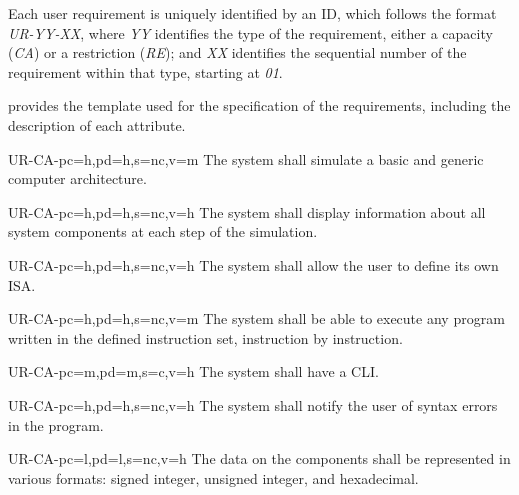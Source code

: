Each user requirement is uniquely identified by an ID, which follows the format \textit{UR-YY-XX}, where \textit{YY} identifies the type of the requirement, either a capacity (\textit{CA}) or a restriction (\textit{RE}); and \textit{XX} identifies the sequential number of the requirement within that type, starting at \textit{01}.

 provides the template used for the specification of the requirements, including the description of each attribute.




\setcounter{i}{1}

\begin{userReq}{UR-CA-}{pc=h,pd=h,s=nc,v=m}
  The system shall simulate a basic and generic computer architecture.
\end{userReq}

\begin{userReq}{UR-CA-}{pc=h,pd=h,s=nc,v=h}
  The system shall display information about all system components at each step of the simulation.
\end{userReq}

\begin{userReq}{UR-CA-}{pc=h,pd=h,s=nc,v=h}
  The system shall allow the user to define its own \gls{ISA}.
\end{userReq}

\begin{userReq}{UR-CA-}{pc=h,pd=h,s=nc,v=m}
  The system shall be able to execute any program written in the defined instruction set, instruction by instruction.
\end{userReq}

\begin{userReq}{UR-CA-}{pc=m,pd=m,s=c,v=h}
  The system shall have a \gls{CLI}.
\end{userReq}

\begin{userReq}{UR-CA-}{pc=h,pd=h,s=nc,v=h}
  The system shall notify the user of syntax errors in the program.
\end{userReq}

\begin{userReq}{UR-CA-}{pc=l,pd=l,s=nc,v=h}
  The data on the components shall be represented in various formats: signed integer, unsigned integer, and hexadecimal.
\end{userReq}

